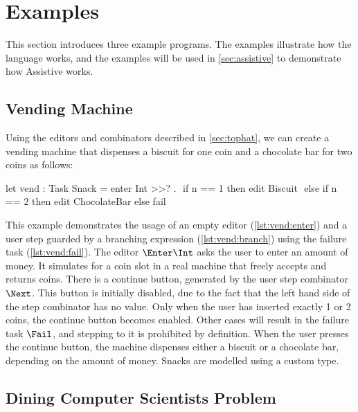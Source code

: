 
\section{Examples}
\label{sec:examples}

This section introduces three example \TOPHAT programs.
The examples illustrate how the \TOPHAT language works, and the examples will be used in \cref{sec:assistive} to demonstrate how Assistive \TOPHAT works.


\subsection{Vending Machine}

Using the editors and combinators described in \cref{sec:tophat},
we can create a vending machine that dispenses a biscuit for one coin and a chocolate bar for two coins as follows:


\begin{TASK}[
    float=ht,
    numbers=right,
    caption={Vending machine dispensing biscuits or chocolate.},
    captionpos=b,
    label=lst:vending]
  let vend : Task Snack = enter Int >>? \n. $\label{lst:vend:enter}$
    if n == 1 then edit Biscuit             $\label{lst:vend:branch}$
    else if n == 2 then edit ChocolateBar
    else fail                               $\label{lst:vend:fail}$
\end{TASK}

This example demonstrates the usage of an empty editor (\cref{lst:vend:enter}) and
a user step guarded by a branching expression (\cref{lst:vend:branch}) using the failure task (\cref{lst:vend:fail}).
The editor $\Enter \Int$ asks the user to enter an amount of money.
It simulates for a coin slot in a real machine that freely accepts and returns coins.
There is a continue button, generated by the user step combinator $\Next$.
This button is initially disabled, due to the fact that the left hand side of the step combinator has no value.
Only when the user has inserted exactly 1 or 2 coins, the continue button becomes enabled.
Other cases will result in the failure task $\Fail$, and stepping to it is prohibited by definition.
When the user presses the continue button, the machine dispenses either a biscuit or a chocolate bar, depending on the amount of money.
Snacks are modelled using a custom type.


\subsection{Dining Computer Scientists Problem}
\label{sec:dining}

